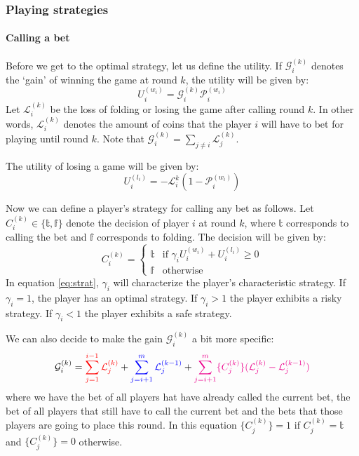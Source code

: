 \documentclass[a4paper,10pt]{article}
\begin{document}
\subsubsection{Playing strategies}
\paragraph{Calling a bet}
Before we get to the optimal strategy, let us define the utility. If $\mathcal G^{(k)}_i$ denotes the `gain' of winning the game at round $k$, the utility will be given by:
\begin{equation}
 U^{(w_i)}_i = \mathcal G^{(k)}_i \mathcal P^{(w_i)}_i
\label{eq:util}
 \end{equation}
Let $\mathcal{L}^{(k)}_i$ be the loss of folding or losing the game after calling round $k$. In other words, $\mathcal L^{(k)}_i$ denotes the amount of coins that the player $i$ will have to bet for playing until round $k$. Note that $\displaystyle \mathcal G^{(k)}_i = \sum_{j\neq i} \mathcal L^{(k)}_j$. 

The utility of losing a game will be given by:
\begin{equation}
 U^{(l_i)}_i = -\mathcal L^{k}_i (1-\mathcal P^{(w_i)}_i)
\end{equation}

Now we can define a player's strategy for calling any bet as follows. Let $C_i^{(k)} \in \{\mathbb t, \mathbb f\}$ denote the decision of player $i$ at round $k$, where $\mathbb t$ corresponds to calling the bet and $\mathbb f$ corresponds to folding. The decision will be given by:
\begin{equation}
C_i^{(k)}  =
\begin{cases}
 \mathbb t & \text{if } \gamma_i U^{(w_i)}_i + U^{(l_i)}_i \geq 0\\
 \mathbb f & \text{otherwise}
\end{cases}
\label{eq:strat}
\end{equation}
In equation \ref{eq:strat}, $\gamma_i$ will characterize the player's characteristic strategy. If $\gamma_i = 1$, the player has an optimal strategy. If $\gamma_i > 1$ the player exhibits a risky strategy. If $\gamma_i < 1$ the player exhibits a safe strategy.

We can also decide to make the gain $\mathcal G^{(k)}_i$ a bit more specific:
\begin{equation}
\mathcal G^{(k)}_i = {\color{red} \sum_{j=1}^{i-1} \mathcal L^{(k)}_j} + {\color{blue} \sum_{j=i+1}^m \mathcal L^{(k-1)}_j} + {\color{magenta} \sum_{j=i+1}^m \{ C^{(k)}_j\} (\mathcal L^{(k)}_j - \mathcal L^{(k-1)}_j)}
\label{eq:gain}
\end{equation}
where we have the {\color{red} bet of all players hat have already called the current bet}, the {\color{blue} bet of all players that still have to call the current bet} and {\color{magenta} the bets that those players are going to place this round}. In this equation $\{C^{(k)}_j\} = 1$ if $C^{(k)}_j=\mathbb{t}$ and $\{C^{(k)}_j\} = 0$ otherwise.
\end{document}
